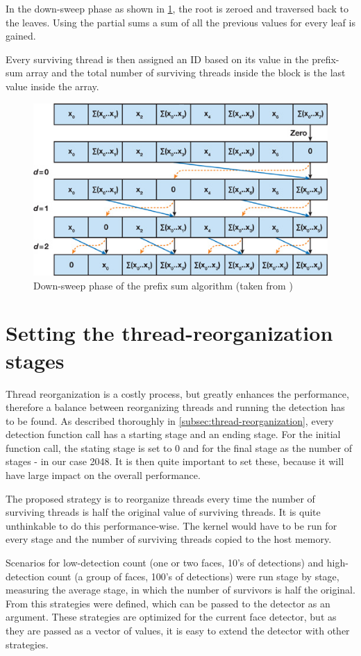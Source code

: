 In the down-sweep phase as shown in \ref{fig:sweepdown}, the root is zeroed and traversed back to the leaves. Using the partial sums a sum of all the previous values for every leaf is gained.

Every surviving thread is then assigned an ID based on its value in the prefix-sum array and the total number of surviving threads inside the block is the last value inside the array.

\begin{center}
\begin{figure}[h]
	\centering\includegraphics[width=0.6\linewidth]{fig/sweepdown.jpg}
	\caption{Down-sweep phase of the prefix sum algorithm (taken from \cite{gems-prefixsum})}
	\label{fig:sweepdown}
\end{figure}
\end{center}

\section{Setting the thread-reorganization stages}

Thread reorganization is a costly process, but greatly enhances the performance, therefore a balance between reorganizing threads and running the detection has to be found. As described thoroughly in \ref{subsec:thread-reorganization}, every detection function call has a starting stage and an ending stage. For the initial function call, the stating stage is set to 0 and for the final stage as the number of stages - in our case 2048. It is then quite important to set these, because it will have large impact on the overall performance.

The proposed strategy is to reorganize threads every time the number of surviving threads is half the original value of surviving threads. It is quite unthinkable to do this performance-wise. The kernel would have to be run for every stage and the number of surviving threads copied to the host memory. 

Scenarios for low-detection count (one or two faces, 10's of detections) and high-detection count (a group of faces, 100's of detections) were run stage by stage, measuring the average stage, in which the number of survivors is half the original. From this strategies were defined, which can be passed to the detector as an argument. These strategies are optimized for the current face detector, but as they are passed as a vector of values, it is easy to extend the detector with other strategies.

